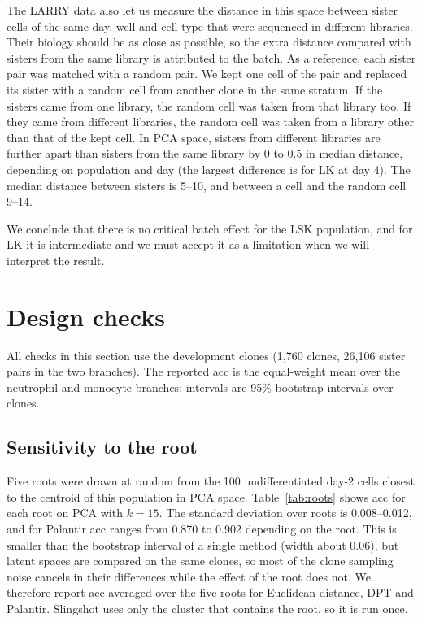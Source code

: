 \documentclass[10pt,a4paper,twocolumn]{article}
\begin{document}
The LARRY data also let us measure the distance in this space between sister cells of the
same day, well and cell type that were sequenced in different libraries. Their biology should be
as close as possible, so the extra distance compared with sisters from the same library is
attributed to the batch. As a reference, each sister pair was matched with a random pair. We kept
one cell of the pair and replaced its sister with a random cell from another clone in the same
stratum. If the sisters came from one library, the random cell was taken from that library too.
If they came from different libraries, the random cell was taken from a library other than that
of the kept cell. In PCA space, sisters from different libraries are further apart than sisters
from the same library by 0 to 0.5 in median distance, depending on population and day (the
largest difference is for LK at day 4). The median distance between sisters is 5--10, and
between a cell and the random cell 9--14.

We conclude that there is no critical batch effect for the LSK population, and for LK it is
intermediate and we must accept it as a limitation when we will interpret the result.

\section{Design checks}
\label{sec:checks}
All checks in this section use the development clones (1{,}760 clones, 26{,}106 sister pairs in
the two branches). The reported acc is the equal-weight mean over the neutrophil and monocyte
branches; intervals are 95\% bootstrap intervals over clones.

\subsection{Sensitivity to the root}
Five roots were drawn at random from the 100 undifferentiated day-2 cells closest to the centroid
of this population in PCA space. Table~\ref{tab:roots} shows acc for each root on PCA with
$k=15$. The standard deviation over roots is 0.008--0.012, and for Palantir acc ranges from 0.870
to 0.902 depending on the root. This is smaller than the bootstrap interval of a single method
(width about 0.06), but latent spaces are compared on the same clones, so most of the clone
sampling noise cancels in their differences while the effect of the root does not. We therefore
report acc averaged over the five roots for Euclidean distance, DPT and Palantir. Slingshot uses
only the cluster that contains the root, so it is run once.
\end{document}
